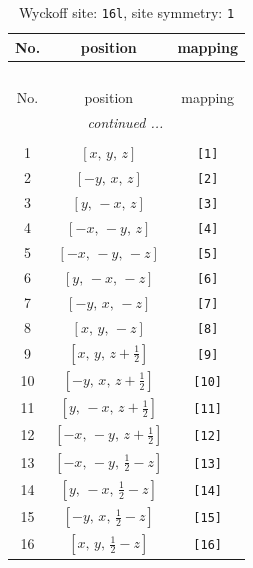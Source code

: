 \documentclass[fleqn,8pt]{jsarticle}
\begin{document}
\begin{longtable}{ccc}
\caption{Wyckoff site: {\tt 16l}, site symmetry: {\tt 1}}
 \\
 \hline \hline
No. & position & mapping \\ \hline \endfirsthead

\multicolumn{2}{l}{\tablename\ \thetable{}} \\
 \hline \hline
No. & position & mapping \\ \hline \endhead

 \hline \hline
\multicolumn{2}{r}{\footnotesize\it continued ...} \\ \endfoot

 \hline \hline
\multicolumn{2}{r}{} \\ \endlastfoot

1 & $\left[ x,\, y,\, z \right]$ & {\tt [1]} \\ \hline
2 & $\left[ - y,\, x,\, z \right]$ & {\tt [2]} \\ \hline
3 & $\left[ y,\, - x,\, z \right]$ & {\tt [3]} \\ \hline
4 & $\left[ - x,\, - y,\, z \right]$ & {\tt [4]} \\ \hline
5 & $\left[ - x,\, - y,\, - z \right]$ & {\tt [5]} \\ \hline
6 & $\left[ y,\, - x,\, - z \right]$ & {\tt [6]} \\ \hline
7 & $\left[ - y,\, x,\, - z \right]$ & {\tt [7]} \\ \hline
8 & $\left[ x,\, y,\, - z \right]$ & {\tt [8]} \\ \hline
9 & $\left[ x,\, y,\, z + \frac{1}{2} \right]$ & {\tt [9]} \\ \hline
10 & $\left[ - y,\, x,\, z + \frac{1}{2} \right]$ & {\tt [10]} \\ \hline
11 & $\left[ y,\, - x,\, z + \frac{1}{2} \right]$ & {\tt [11]} \\ \hline
12 & $\left[ - x,\, - y,\, z + \frac{1}{2} \right]$ & {\tt [12]} \\ \hline
13 & $\left[ - x,\, - y,\, \frac{1}{2} - z \right]$ & {\tt [13]} \\ \hline
14 & $\left[ y,\, - x,\, \frac{1}{2} - z \right]$ & {\tt [14]} \\ \hline
15 & $\left[ - y,\, x,\, \frac{1}{2} - z \right]$ & {\tt [15]} \\ \hline
16 & $\left[ x,\, y,\, \frac{1}{2} - z \right]$ & {\tt [16]} \\
\end{longtable}
\end{document}
